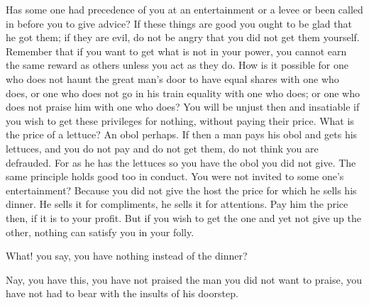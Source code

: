 Has some  one had  precedence of  you at an  entertainment or  a levee  or been
called in before you  to give advice? If these things are good  you ought to be
glad that he got them;  if they are evil, do not be angry  that you did not get
them yourself. Remember that if you want to  get what is not in your power, you
cannot earn  the same reward  as others unless  you act as  they do. How  is it
possible for one who  does not haunt the great man's door  to have equal shares
with one who  does, or one who does  not go in his train equality  with one who
does; or one who does not praise him with one who does? You will be unjust then
and insatiable if you wish to  get these privileges for nothing, without paying
their price.  What is the price  of a lettuce? An  obol perhaps. If then  a man
pays his obol and gets his lettuces, and you do not pay and do not get them, do
not think you  are defrauded. For as he  has the lettuces so you  have the obol
you did not  give. The same principle  holds good too in conduct.  You were not
invited to  some one's  entertainment? Because  you did not  give the  host the
price for which he  sells his dinner. He sells it for  compliments, he sells it
for attentions.  Pay him the price  then, if it is  to your profit. But  if you
wish to get the  one and yet not give up the other,  nothing can satisfy you in
your folly.

What! you say, you have nothing instead of the dinner?

Nay, you have  this, you have not praised  the man you did not  want to praise,
you have not had to bear with the insults of his doorstep.
